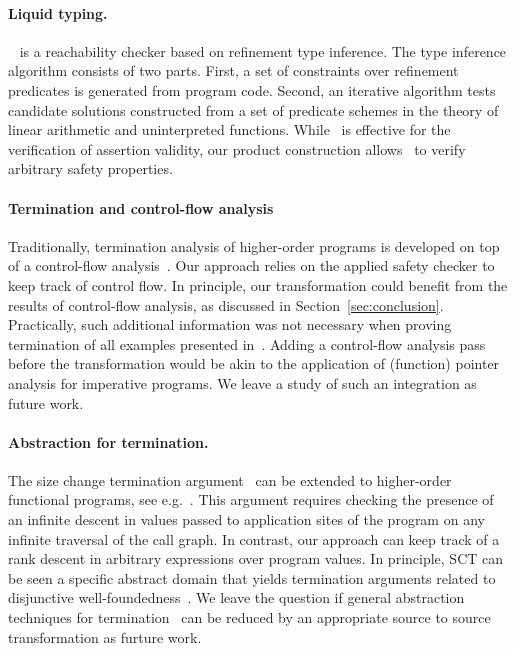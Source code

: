 {\paragraph{Liquid typing.}

\dsolve\ \cite{Dsolve} is a reachability checker based on refinement
type inference.  The type inference algorithm consists of two
parts. First, a set of constraints over refinement predicates is
generated from program code. Second, an iterative algorithm tests
candidate solutions constructed from a set of predicate schemes in the
theory of linear arithmetic and uninterpreted functions. While \dsolve\
is effective for the verification of assertion validity, our product
construction allows \dsolve\ to verify arbitrary safety properties.



}{

\paragraph{Termination and control-flow analysis}

Traditionally, termination analysis of higher-order programs is
developed on top of a control-flow
analysis~\cite{Sereni05terminationanalysis,SereniAPLAS05,SereniICFP07}.
Our approach relies on the applied safety checker to keep track of
control flow. 
In principle, our transformation could benefit from the results of
control-flow analysis, as discussed in Section~\ref{sec:conclusion}. 
Practically, such additional information was not necessary when
proving termination of all examples presented
in~\cite{Sereni05terminationanalysis,SereniAPLAS05,SereniICFP07}.
Adding a control-flow analysis
pass~\cite{Shivers88,MightJFP08,MightPOPL11,MightSCHEME2010} before the transformation
would be akin to the application of (function) pointer analysis for
imperative programs. 
We leave a study of such an integration as future work.

  \paragraph{Abstraction for termination.} The size change termination
  argument~\cite{SCTPOPL2001} can be extended to higher-order functional
  programs, see e.g.~\cite{JonesBohr04,SereniAPLAS05}. This argument requires checking the presence of an
  infinite descent in values passed to application sites of the program
  on any infinite traversal of the call graph. In contrast, our
  approach can keep track of a rank descent in arbitrary expressions
  over program values.
  In principle, SCT can be seen a specific abstract domain that yields
  termination arguments related to disjunctive
  well-foundedness~\cite{PodelskiSAS10}.
  We leave the question if general abstraction techniques for
termination~\cite{CousotHigherOrder94,CousotPOPL12} can be reduced by
an appropriate source to source transformation as furture work.


}
